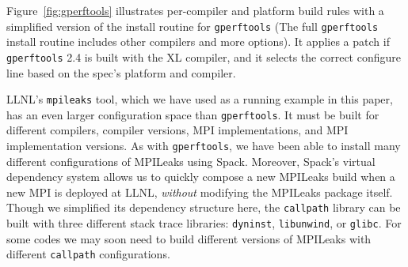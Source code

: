 Figure~\ref{fig:gperftools} illustrates per-compiler and platform build rules with
a simplified version of the install routine for {\tt gperftools} (The full
{\tt gperftools} install routine includes other compilers and more options).  It applies a patch if {\tt gperftools} 2.4 is built with the XL compiler,
and it selects the correct configure line based on the spec's platform and compiler.

LLNL's {\tt mpileaks} tool, which we have used as a running example in this paper,
has an even larger configuration space than {\tt gperftools}.  It must be built
for different compilers, compiler versions, MPI implementations, and MPI implementation
versions. As with {\tt gperftools}, we have been able to install many different
configurations of MPILeaks using Spack.  Moreover, Spack's virtual dependency system
allows us to
quickly compose a new MPILeaks build when a new MPI is deployed at LLNL, {\it without}
modifying the MPILeaks package itself. Though we simplified its dependency structure
here, the {\tt callpath} library can be built with three different stack trace libraries:
{\tt dyninst}, {\tt libunwind}, or {\tt glibc}.  For some codes we may soon need to build
different versions of MPILeaks with different {\tt callpath} configurations.

